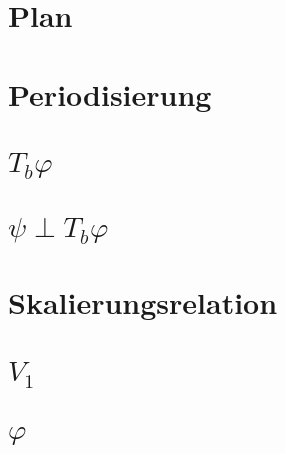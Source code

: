 %
%
%


\section{Plan}


\section{Periodisierung}


\section{$T_b\varphi$}


\section{$\psi\perp T_b\varphi$}


\section{Skalierungsrelation}


\section{$V_1$}


\section{$\varphi$}



